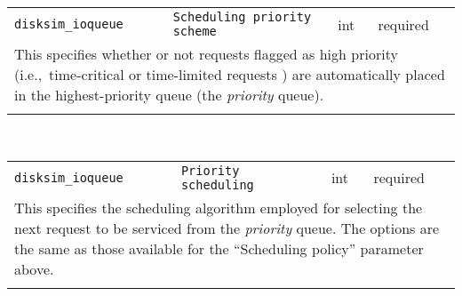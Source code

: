 \noindent 
\begin{tabular}{|p{1.5in}|p{3.5in}|p{0.5in}|p{0.5in}|}
\cline{1-4}
\texttt{disksim\_ioqueue} & \texttt{Scheduling priority scheme} & int & required \\ 
\cline{1-4}
\multicolumn{4}{|p{6in}|}{
This specifies whether or not requests flagged as high priority
(i.e.,~time-critical or time-limited requests \cite{Ganger93}) are
automatically placed in the highest-priority queue (the {\it priority}
queue).
}\\ 
\cline{1-4}
\multicolumn{4}{p{5in}}{}\\
\end{tabular}\\ 
\noindent 
\begin{tabular}{|p{1.5in}|p{3.5in}|p{0.5in}|p{0.5in}|}
\cline{1-4}
\texttt{disksim\_ioqueue} & \texttt{Priority scheduling} & int & required \\ 
\cline{1-4}
\multicolumn{4}{|p{6in}|}{
This specifies the scheduling algorithm employed for selecting the next
request to be serviced from the {\it priority} queue. The options are
the same as those available for the ``Scheduling policy'' parameter
above.
}\\ 
\cline{1-4}
\multicolumn{4}{p{5in}}{}\\
\end{tabular}\\ 
